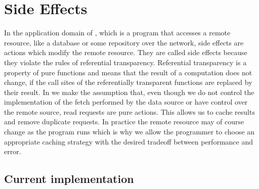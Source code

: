 \chapter{Side Effects}
\label{ch:side-effects}


In the application domain of \yauhau{}, which is a program that accesses a remote resource, like a database or some repository over the network, side effects are actions which modify the remote resource.
They are called side effects because they violate the rules of referential transparency.
Referential transparency is a property of pure functions and means that the result of a computation does not change, if the call sites of the referentially transparent functions are replaced by their result.
In \yauhau{} we make the assumption that, even though we do not control the implementation of the fetch performed by the data source or have control over the remote source, read requests are pure actions.
This allows us to cache results and remove duplicate requests.
In practice the remote resource may of course change as the program runs which is why we allow the programmer to choose an appropriate caching strategy with the desired tradeoff between performance and error.

\section{Current implementation}

